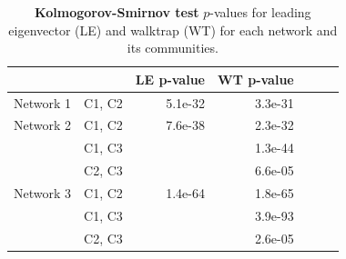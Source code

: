 \begin{table}
\centering
\caption[Kolmogorov-Smirnov test]{\textbf{Kolmogorov-Smirnov test} $p$-values for leading eigenvector (LE) and walktrap (WT) for each network and its communities.}
\label{tab:pvalues2}
\vspace*{5mm}
\begin{tabular}{lcrrrrr}
	\toprule

	\rowcolor{Gray}
	 & & LE p-value & WT p-value\\
	\midrule 
	\quad Network 1  & C1, C2 & 5.1e-32 & 3.3e-31 \\
	\midrule   							
	\quad Network 2  & C1, C2 & 7.6e-38 & 2.3e-32 \\
					    & C1, C3 & & 1.3e-44\\
					    & C2, C3 & & 6.6e-05\\
	\midrule  
	\quad Network 3  & C1, C2 & 1.4e-64 & 1.8e-65\\
					    & C1, C3 & &3.9e-93\\
						& C2, C3 & &2.6e-05\\ 
	\bottomrule
\end{tabular}
\end{table}


